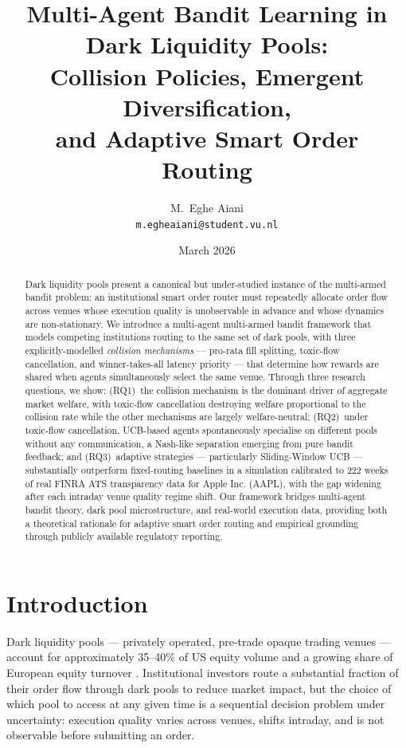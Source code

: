 \documentclass[11pt]{article}
\title{\textbf{Multi-Agent Bandit Learning in Dark Liquidity Pools:\\
Collision Policies, Emergent Diversification,\\
and Adaptive Smart Order Routing}}
\author{
  M.~Eghe Aiani\\
  \texttt{m.egheaiani@student.vu.nl}
}
\date{March 2026}
\begin{document}
\maketitle

\begin{abstract}
Dark liquidity pools present a canonical but under-studied instance of the
multi-armed bandit problem: an institutional smart order router must
repeatedly allocate order flow across venues whose execution quality is
unobservable in advance and whose dynamics are non-stationary.
We introduce a multi-agent multi-armed bandit framework that models
competing institutions routing to the same set of dark pools, with three
explicitly-modelled \emph{collision mechanisms} — pro-rata fill splitting,
toxic-flow cancellation, and winner-takes-all latency priority — that
determine how rewards are shared when agents simultaneously select the same
venue.
Through three research questions, we show: (RQ1)~the collision mechanism
is the dominant driver of aggregate market welfare, with toxic-flow
cancellation destroying welfare proportional to the collision rate while
the other mechanisms are largely welfare-neutral; (RQ2)~under toxic-flow
cancellation, UCB-based agents spontaneously specialise on different pools
without any communication, a Nash-like separation emerging from pure
bandit feedback; and (RQ3)~adaptive strategies --- particularly
Sliding-Window UCB --- substantially outperform fixed-routing baselines in
a simulation calibrated to 222 weeks of real FINRA ATS transparency data
for Apple Inc. (AAPL), with the gap widening after each intraday venue
quality regime shift.
Our framework bridges multi-agent bandit theory, dark pool microstructure,
and real-world execution data, providing both a theoretical rationale for
adaptive smart order routing and empirical grounding through publicly
available regulatory reporting.
\end{abstract}

\tableofcontents
\newpage

\section{Introduction}
\label{sec:intro}

Dark liquidity pools --- privately operated, pre-trade opaque trading
venues --- account for approximately 35--40\% of US equity volume and a
growing share of European equity turnover \citep{foley2016dark}.
Institutional investors route a substantial fraction of their order flow
through dark pools to reduce market impact, but the choice of which pool
to access at any given time is a sequential decision problem under
uncertainty: execution quality varies across venues, shifts intraday, and
is not observable before submitting an order.
\end{document}
